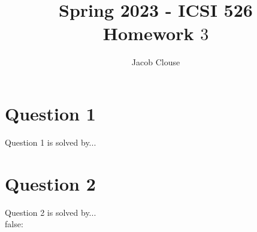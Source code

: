 \documentclass[10pt]{article}
\author{Jacob Clouse}
\title{Spring 2023 - ICSI 526\\Homework $3$}
\begin{document}
\maketitle
\tableofcontents
\vspace{0.2in}
\section{Question 1}
\noindent Question 1 is solved by...
\vspace{0.2in}
\section{Question 2}
\noindent Question 2 is solved by...
\vspace{0.2in}
\\








\if false:
\end{document}
